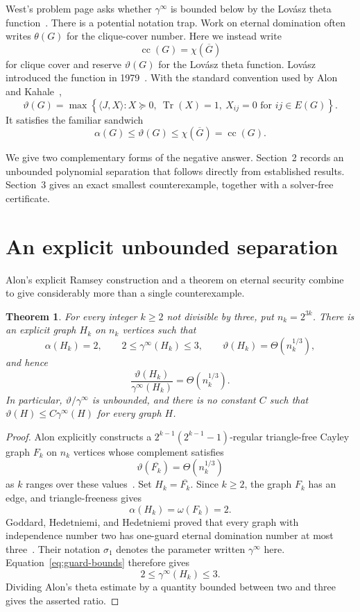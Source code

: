 \documentclass[11pt]{article}
\newtheorem{theorem}{Theorem}
\newcommand{\cc}{\operatorname{cc}}
\begin{document}
West's problem page asks whether \(\gamma^\infty\) is bounded below by the
Lov\'asz theta function~\cite{west}.  There is a potential notation trap.
Work on eternal domination often writes \(\theta(G)\) for the clique-cover
number.  Here we instead write
\[
 \cc(G)=\chi(\overline G)
\]
for clique cover and reserve \(\vartheta(G)\) for the Lov\'asz theta function.
Lov\'asz introduced the function in 1979~\cite{lovasz}.  With the standard
convention used by Alon and Kahale~\cite{alon-kahale},
\begin{equation}\label{eq:theta}
 \vartheta(G)=
 \max\left\{\langle J,X\rangle:
 X\succeq0,\ \operatorname{Tr}(X)=1,\
 X_{ij}=0\text{ for }ij\in E(G)\right\}.
\end{equation}
It satisfies the familiar sandwich
\begin{equation}\label{eq:sandwich}
 \alpha(G)\leq\vartheta(G)\leq\chi(\overline G)=\cc(G).
\end{equation}

We give two complementary forms of the negative answer.  Section~2 records
an unbounded polynomial separation that follows directly from established
results.  Section~3 gives an exact smallest counterexample, together with a
solver-free certificate.

\section{An explicit unbounded separation}

Alon's explicit Ramsey construction and a theorem on eternal security combine
to give considerably more than a single counterexample.

\begin{theorem}\label{thm:unbounded}
For every integer \(k\geq2\) not divisible by three, put \(n_k=2^{3k}\).
There is an explicit graph \(H_k\) on \(n_k\) vertices such that
\[
 \alpha(H_k)=2,\qquad
 2\leq\gamma^\infty(H_k)\leq3,
 \qquad
 \vartheta(H_k)=\Theta(n_k^{1/3}),
\]
and hence
\[
 \frac{\vartheta(H_k)}{\gamma^\infty(H_k)}
 =\Theta(n_k^{1/3}).
\]
In particular, \(\vartheta/\gamma^\infty\) is unbounded, and there is no
constant \(C\) such that
\(\vartheta(H)\leq C\gamma^\infty(H)\) for every graph \(H\).
\end{theorem}

\begin{proof}
Alon explicitly constructs a
\(2^{k-1}(2^{k-1}-1)\)-regular triangle-free Cayley graph \(F_k\) on
\(n_k\) vertices whose complement satisfies
\[
 \vartheta(\overline{F_k})=\Theta(n_k^{1/3})
\]
as \(k\) ranges over these values~\cite[Corollary~2.3]{alon-ramsey}.  Set
\(H_k=\overline{F_k}\).  Since \(k\geq2\), the graph \(F_k\) has an edge,
and triangle-freeness gives
\[
 \alpha(H_k)=\omega(F_k)=2.
\]
Goddard, Hedetniemi, and Hedetniemi proved that every graph with independence
number two has one-guard eternal domination number at most
three~\cite[Theorem~4]{ghh}.  Their notation \(\sigma_1\) denotes the
parameter written \(\gamma^\infty\) here.  Equation~\eqref{eq:guard-bounds}
therefore gives
\[
 2\leq\gamma^\infty(H_k)\leq3.
\]
Dividing Alon's theta estimate by a quantity bounded between two and three
gives the asserted ratio.
\end{proof}
\end{document}
